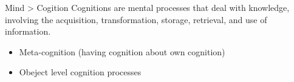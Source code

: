 \begin{frame}{Mind > Cogition}
    Cognitions are mental processes that deal with knowledge, involving the acquisition, transformation, storage, retrieval, and use of information. \cite{revlin-2012-cognition-theory-and-practice}
    \begin{itemize}
        \item Meta-cognition (having cognition about own cognition)
        \item Obeject level cognition processes
    \end{itemize}
\end{frame}